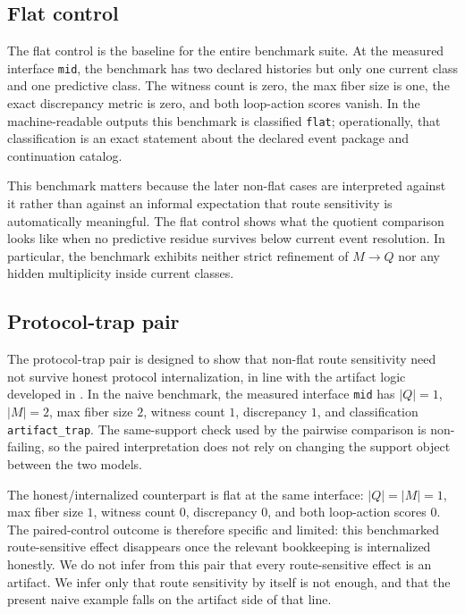 \documentclass[11pt]{article}
\newcommand{\CurrentQ}{Q}
\newcommand{\PredictiveQ}{M}
\theoremstyle{definition}
\begin{document}
\subsection{Flat control}\label{subsec:bench-flat}
The flat control is the baseline for the entire benchmark suite. At the measured interface \texttt{mid}, the benchmark has two declared histories but only one current class and one predictive class. The witness count is zero, the max fiber size is one, the exact discrepancy metric is zero, and both loop-action scores vanish. In the machine-readable outputs this benchmark is classified \texttt{flat}; operationally, that classification is an exact statement about the declared event package and continuation catalog.

This benchmark matters because the later non-flat cases are interpreted against it rather than against an informal expectation that route sensitivity is automatically meaningful. The flat control shows what the quotient comparison looks like when no predictive residue survives below current event resolution. In particular, the benchmark exhibits neither strict refinement of $\PredictiveQ \to \CurrentQ$ nor any hidden multiplicity inside current classes.

\subsection{Protocol-trap pair}\label{subsec:bench-protocol-trap}
The protocol-trap pair is designed to show that non-flat route sensitivity need not survive honest protocol internalization, in line with the artifact logic developed in \citep{Tsiokos2026ProtocolTrap}. In the naive benchmark, the measured interface \texttt{mid} has $|\CurrentQ|=1$, $|\PredictiveQ|=2$, max fiber size $2$, witness count $1$, discrepancy $1$, and classification \texttt{artifact\_trap}. The same-support check used by the pairwise comparison is non-failing, so the paired interpretation does not rely on changing the support object between the two models.

The honest/internalized counterpart is flat at the same interface: $|\CurrentQ|=|\PredictiveQ|=1$, max fiber size $1$, witness count $0$, discrepancy $0$, and both loop-action scores $0$. The paired-control outcome is therefore specific and limited: this benchmarked route-sensitive effect disappears once the relevant bookkeeping is internalized honestly. We do not infer from this pair that every route-sensitive effect is an artifact. We infer only that route sensitivity by itself is not enough, and that the present naive example falls on the artifact side of that line.
\end{document}
